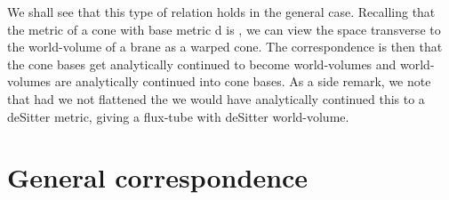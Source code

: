 \documentclass[a4paper,11pt]{article}
\begin{document}
We shall see that this type of relation holds in the general case. Recalling
that the metric of a cone with base metric d\coordHE{} is 
\mbox{\coordHE{}}, we can view the space transverse to
the world-volume of a brane as a warped cone. The correspondence is then that
the cone bases get analytically continued to become world-volumes and 
world-volumes are analytically continued into cone bases.
As a side remark, we note that had we not flattened the
\coordHE{} we would have analytically continued this to a
deSitter metric, giving a flux-tube with deSitter world-volume. 

\setcounter{equation}{0}
\section{General correspondence}
\end{document}
